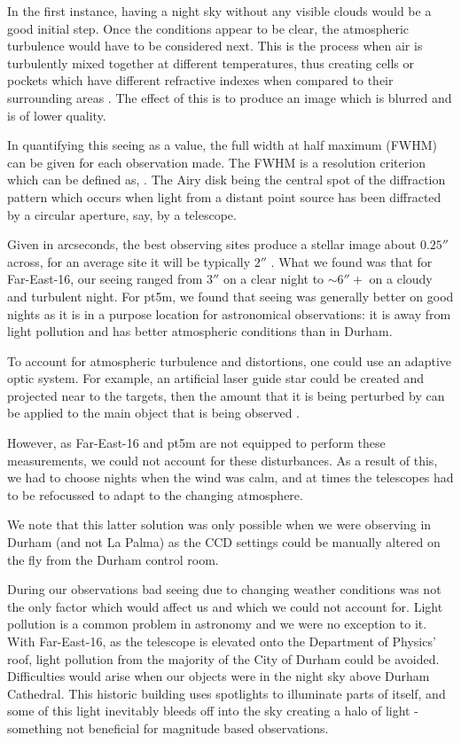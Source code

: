 \documentclass[twocolumn]{revtex4}
\begin{document}
In the first instance, having a night sky without any visible clouds would be a good initial step. Once the conditions appear to be clear, the atmospheric turbulence would have to be considered next. This is the process when air is turbulently mixed together at different temperatures, thus creating cells or pockets which have different refractive indexes when compared to their surrounding areas \cite{princ_stell_inter}. The effect of this is to produce an image which is blurred and is of lower quality.

In quantifying this seeing as a value, the full width at half maximum (FWHM) can be given for each observation made. The FWHM is a resolution criterion which can be defined as,  \cite{princ_stell_inter}. The Airy disk being the central spot of the diffraction pattern which occurs when light from a distant point source has been diffracted by a circular aperture, say, by a telescope. 

Given in arcseconds, the best observing sites produce a stellar image about $0.25''$ across, for an average site it will be typically $2''$ \cite{tel_tech}. What we found was that for Far-East-16, our seeing ranged from $3''$ on a clear night to $\sim6''+$ on a cloudy and turbulent night. For pt5m, we found that seeing was generally better on good nights as it is in a purpose location for astronomical observations: it is away from light pollution and has better atmospheric conditions than in Durham.

To account for atmospheric turbulence and distortions, one could use an adaptive optic system. For example, an artificial laser guide star could be created and projected near to the targets, then the amount that it is being perturbed by can be applied to the main object that is being observed \cite{princ_stell_inter}.

However, as Far-East-16 and pt5m are not equipped to perform these measurements, we could not account for these disturbances. As a result of this, we had to choose nights when the wind was calm, and at times the telescopes had to be refocussed to adapt to the changing atmosphere.

We note that this latter solution was only possible when we were observing in Durham (and not La Palma) as the CCD settings could be manually altered on the fly from the Durham control room.

During our observations bad seeing due to changing weather conditions was not the only factor which would affect us and which we could not account for. Light pollution is a common problem in astronomy and we were no exception to it. With Far-East-16, as the telescope is elevated onto the Department of Physics' roof, light pollution from the majority of the City of Durham could be avoided. Difficulties would arise when our objects were in the night sky above Durham Cathedral. This historic building uses spotlights to illuminate parts of itself, and some of this light inevitably bleeds off into the sky creating a halo of light - something not beneficial for magnitude based observations.
\end{document}
